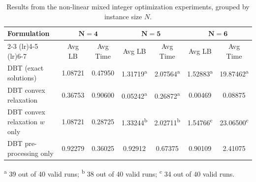 \documentclass[11pt,reqno,a4paper]{amsart}
\numberwithin{equation}{section}
\theoremstyle{mytheorem}
\theoremstyle{myremark}
\theoremstyle{myparagraph}
\begin{document}
    \begin{table}[ht]
        \centering
        \scriptsize
        \renewcommand{\arraystretch}{1.2}
        \setlength{\tabcolsep}{6pt}
        \begin{threeparttable}
            \begin{tabular}{l cc|cc|cc}
                \toprule
                \textbf{Formulation} & \multicolumn{2}{c|}{\(\mathbf{N=4}\)} & \multicolumn{2}{c|}{\(\mathbf{N=5}\)} & \multicolumn{2}{c}{\(\mathbf{N=6}\)} \\
                \cmidrule(lr){2-3} \cmidrule(lr){4-5} \cmidrule(lr){6-7}
                & Avg LB  & Avg Time & Avg LB                     & Avg Time                   & Avg LB                     & Avg Time                    \\
                \midrule
                DBT (exact solutions)            & 1.08721 & 0.47950  & 1.31719\textsuperscript{a} & 2.07564\textsuperscript{a} & 1.52883\textsuperscript{a} & 19.87462\textsuperscript{a} \\
                DBT convex relaxation            & 0.36753 & 0.90600  & 0.05242\textsuperscript{a} & 0.26872\textsuperscript{a} & 0.00469           & 0.08875           \\
                DBT convex relaxation \(w\) only & 1.08721 & 0.28725  & 1.33244\textsuperscript{b} & 2.02711\textsuperscript{b} & 1.54766\textsuperscript{c} & 23.06500\textsuperscript{c} \\
                DBT pre-processing only          & 0.92279 & 0.36025  & 0.92912                    & 0.67375                    & 0.90109                    & 2.41075                     \\
                \bottomrule
            \end{tabular}
        \end{threeparttable}
        \begin{tablenotes}
            \footnotesize
            \item[] \textsuperscript{a} 39 out of 40 valid runs; \textsuperscript{b} 38 out of 40 valid runs; \textsuperscript{c} 34 out of 40 valid runs.
        \end{tablenotes}
        \caption{Results from the non-linear mixed integer optimization experiments, grouped by instance size \(N\).}
        \label{tab:experiment_results_grouped}
    \end{table}
\end{document}
